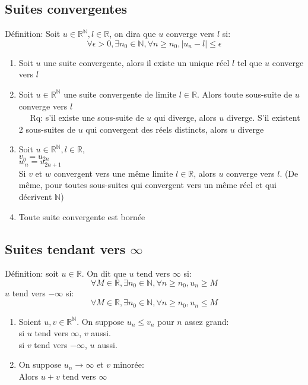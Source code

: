 \documentclass[fleqn]{article}
\begin{document}
\subsection{Suites convergentes}
D\'efinition: Soit $u \in \mathbb{R}^\mathbb{N}, l \in \mathbb{R}$, on dira que $u$ converge vers $l$ si:
\[\forall \epsilon > 0, \exists n_0 \in \mathbb{N}, \forall n \geq n_0, |u_n - l| \leq \epsilon\]
\begin{enumerate}
	\item Soit $u$ une suite convergente, alors il existe un unique r\'eel $l$ tel que $u$ converge vers $l$
	\item Soit $u \in \mathbb{R}^\mathbb{N}$ une suite convergente de limite $l \in \mathbb{R}$. Alors toute sous-suite de $u$ converge
	vers $l$ \\
	$\quad$ Rq: s'il existe une sous-suite de $u$ qui diverge, alors $u$ diverge. S'il existent 2 sous-suites de $u$ qui convergent des
	r\'eels distincts, alors $u$ diverge
	\item Soit $u \in \mathbb{R}^\mathbb{N}, l \in \mathbb{R}$, \\
			$v_n = u_{2n}$ \\
			$w_n = u_{2n+1}$ \\
		Si $v$ et $w$ convergent vers une m\^eme limite $l \in \mathbb{R}$, alors $u$ converge vers $l$.
		(De m\^eme, pour toutes sous-suites qui convergent vers un m\^eme r\'eel et qui d\'ecrivent $\mathbb{N}$)
	\item Toute suite convergente  est born\'ee
\end{enumerate}

\subsection{Suites tendant vers $\infty$}
D\'efinition: soit $u \in \mathbb{R}$. On dit que $u$ tend vers $\infty$ si:
\[\forall M \in \mathbb{R}, \exists n_0 \in \mathbb{N}, \forall n \geq n_0, u_n \geq M\]
$u$ tend vers $-\infty$ si:
\[\forall M \in \mathbb{R}, \exists n_0 \in \mathbb{N}, \forall n \geq n_0, u_n \leq M\]
\begin{enumerate}
	\item Soient $u, v \in \mathbb{R}^\mathbb{N}$. On suppose $u_n \leq v_n$ pour $n$ assez grand: \\
		si $u$ tend vers $\infty$, $v$ aussi. \\
		si $v$ tend vers $-\infty$, $u$ aussi.
	\item On suppose $u_n \rightarrow \infty$ et $v$ minor\'ee: \\
		Alors $u+v$ tend vers $\infty$
\end{enumerate}
\end{document}
